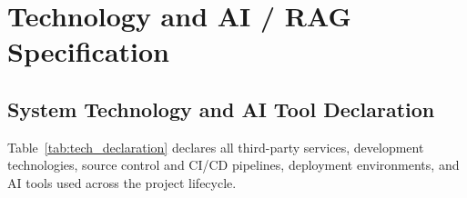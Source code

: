 \section{Technology and AI / RAG Specification}

\subsection{System Technology and AI Tool Declaration}

Table~\ref{tab:tech_declaration} declares all third-party services, development technologies, source control and CI/CD pipelines, deployment environments, and AI tools used across the project lifecycle.

